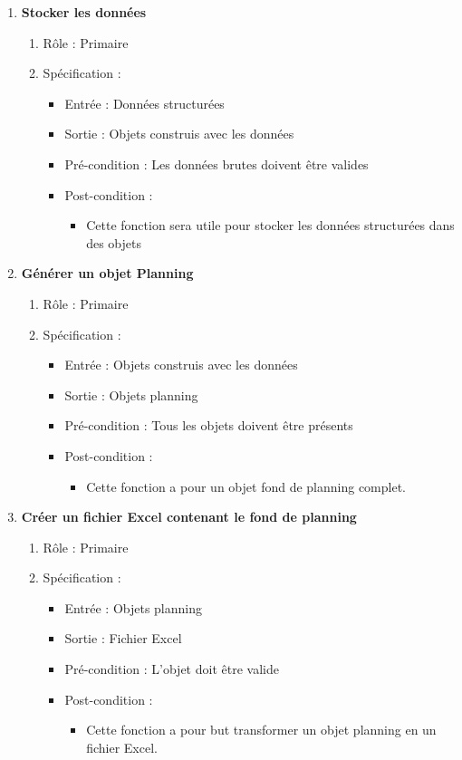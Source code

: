 \documentclass{polytech/polytech}
\begin{document}
\begin{enumerate}
		\item \textbf{Stocker les données}
		\begin{enumerate}
			\item Rôle :  Primaire
			\item Spécification :
			\begin{itemize}
				\item Entrée : Données structurées
				\item Sortie : Objets construis avec les données
				\item Pré-condition : Les données brutes doivent être valides
				\item Post-condition :
				\begin{itemize}[label=\textbullet, font=\LARGE]
					\item Cette fonction sera utile pour stocker les données structurées dans des objets
				\end{itemize}
			\end{itemize}
		\end{enumerate}

		\item \textbf{Générer un objet Planning}
		\begin{enumerate}
			\item Rôle :  Primaire
			\item Spécification :
			\begin{itemize}
				\item Entrée : Objets construis avec les données
				\item Sortie : Objets planning
				\item Pré-condition : Tous les objets doivent être présents
				\item Post-condition :
				\begin{itemize}[label=\textbullet, font=\LARGE]
					\item Cette fonction a pour un objet fond de planning complet.
				\end{itemize}
			\end{itemize}
		\end{enumerate}

		\item \textbf{Créer un fichier Excel contenant le fond de planning}
		\begin{enumerate}
			\item Rôle :  Primaire
			\item Spécification :
			\begin{itemize}
				\item Entrée : Objets planning
				\item Sortie : Fichier Excel
				\item Pré-condition : L'objet doit être valide
				\item Post-condition :
				\begin{itemize}[label=\textbullet, font=\LARGE]
					\item Cette fonction a pour but transformer un objet planning en un fichier Excel.
				\end{itemize}
			\end{itemize}
		\end{enumerate}
	\end{enumerate}
\end{document}
